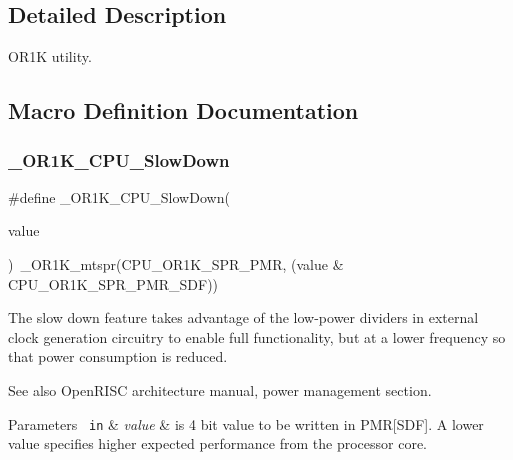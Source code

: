 \subsection{Detailed Description}
O\+R1K utility. 



\subsection{Macro Definition Documentation}
\mbox{\label{or1k-utility_8h_ab7ba4a2a12f4b19ae1c1e9abe2d42f7c}} 
\subsubsection{\texorpdfstring{\_OR1K\_CPU\_SlowDown}{\_OR1K\_CPU\_SlowDown}}
{\footnotesize\ttfamily \#define \+\_\+\+O\+R1\+K\+\_\+\+C\+P\+U\+\_\+\+Slow\+Down(\begin{DoxyParamCaption}\item[{}]{value }\end{DoxyParamCaption})~\+\_\+\+O\+R1\+K\+\_\+mtspr(C\+P\+U\+\_\+\+O\+R1\+K\+\_\+\+S\+P\+R\+\_\+\+P\+MR, (value \& C\+P\+U\+\_\+\+O\+R1\+K\+\_\+\+S\+P\+R\+\_\+\+P\+M\+R\+\_\+\+S\+DF))}



The slow down feature takes advantage of the low-\/power dividers in external clock generation circuitry to enable full functionality, but at a lower frequency so that power consumption is reduced. 

\begin{DoxySeeAlso}{See also}
Open\+R\+I\+SC architecture manual, power management section.
\end{DoxySeeAlso}

\begin{DoxyParams}[1]{Parameters}
\mbox{\texttt{ in}}  & {\em value} & is 4 bit value to be written in P\+MR\mbox{[}S\+DF\mbox{]}. A lower value specifies higher expected performance from the processor core. \\
\hline
\end{DoxyParams}
\mbox{\label{or1k-utility_8h_a48b0b2071b54ae5c6d900674c7ab4016}} 
